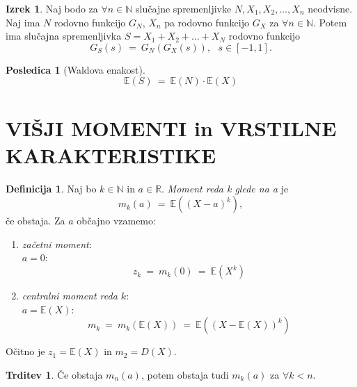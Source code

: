 \documentclass[11pt]{article}
\theoremstyle{definition}
\newtheorem{definicija}{Definicija}[section]
\theoremstyle{definition}
\newtheorem{trditev}{Trditev}[section]
\theoremstyle{definition}
\newtheorem{izrek}{Izrek}[section]
\newtheorem*{posledica}{Posledica}
\begin{document}
\begin{izrek}

Naj bodo za $\forall n \in \mathbb{N}$ slučajne spremenljivke $N, X_1, X_2, \ldots, X_n$ neodvisne. Naj ima $N$ rodovno funkcijo $G_N$, $X_n$ pa rodovno funkcijo $G_X$ za $\forall n \in \mathbb{N}$. Potem ima slučajna spremenljivka $S = X_1 + X_2 + \ldots + X_N$ rodovno funkcijo
$$G_S(s) ~=~ G_N(G_X(s)), ~~~s \in [-1, 1].$$ 

\end{izrek}
\vspace{0.5cm}

\begin{posledica}[Waldova enakost]

$$\mathbb{E}(S) ~=~ \mathbb{E}(N) \cdot \mathbb{E}(X)$$

\end{posledica}
\vspace{0.5cm}

\pagebreak


\section{VIŠJI MOMENTI in VRSTILNE \\KARAKTERISTIKE}
\vspace{0.5cm}

\begin{definicija}

Naj bo $k \in \mathbb{N}$ in $a \in \mathbb{R}$. \textit{Moment reda k glede na a} je
$$m_k(a) ~=~ \mathbb{E}((X-a)^k),$$
če obstaja. Za $a$ občajno vzamemo:
\begin{enumerate}
	\item \textit{začetni moment}: \\$a = 0$: $$z_k ~=~ m_k(0) ~=~ \mathbb{E}(X^k)$$
	\item \textit{centralni moment reda $k$}: \\$a = \mathbb{E}(X)$: $$m_k ~=~ m_k(\mathbb{E}(X)) ~=~ \mathbb{E}((X - \mathbb{E}(X))^k)$$
\end{enumerate}
Očitno je $z_1 = \mathbb{E}(X)$ in $m_2 = D(X)$.

\end{definicija}
\vspace{0.5cm}

\begin{trditev}

Če obstaja $m_n(a)$, potem obstaja tudi $m_k(a)$ za $\forall k < n$.

\end{trditev}
\vspace{0.5cm}
\end{document}
